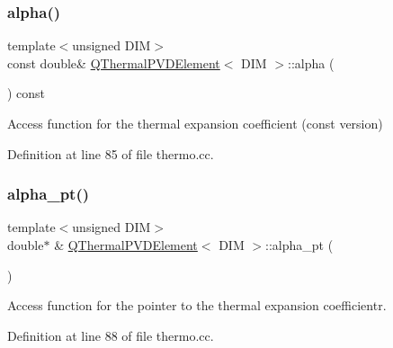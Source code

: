 \subsubsection{\texorpdfstring{alpha()}{alpha()}}
{\footnotesize\ttfamily template$<$unsigned D\+IM$>$ \\
const double\& \hyperlink{classQThermalPVDElement}{Q\+Thermal\+P\+V\+D\+Element}$<$ D\+IM $>$\+::alpha (\begin{DoxyParamCaption}{ }\end{DoxyParamCaption}) const\hspace{0.3cm}{\ttfamily [inline]}}



Access function for the thermal expansion coefficient (const version) 



Definition at line 85 of file thermo.\+cc.

\mbox{\label{classQThermalPVDElement_a57fb80dd582c02c0e8c7dc17491bf76f}} 
\subsubsection{\texorpdfstring{alpha\+\_\+pt()}{alpha\_pt()}}
{\footnotesize\ttfamily template$<$unsigned D\+IM$>$ \\
double$\ast$ \& \hyperlink{classQThermalPVDElement}{Q\+Thermal\+P\+V\+D\+Element}$<$ D\+IM $>$\+::alpha\+\_\+pt (\begin{DoxyParamCaption}{ }\end{DoxyParamCaption})\hspace{0.3cm}{\ttfamily [inline]}}



Access function for the pointer to the thermal expansion coefficientr. 



Definition at line 88 of file thermo.\+cc.

\mbox{\label{classQThermalPVDElement_a64e5047e9a054544b61a6e8cf5534364}} 
